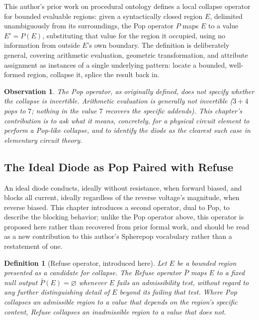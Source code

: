\documentclass[12pt]{article}
\newtheorem{definition}{Definition}
\newtheorem{observation}{Observation}
\begin{document}
This author's prior work on procedural ontology defines a local collapse operator for bounded evaluable regions: given a syntactically closed region $E$, delimited unambiguously from its surroundings, the Pop operator $P$ maps $E$ to a value $E' = P(E)$, substituting that value for the region it occupied, using no information from outside $E$'s own boundary. The definition is deliberately general, covering arithmetic evaluation, geometric transformation, and attribute assignment as instances of a single underlying pattern: locate a bounded, well-formed region, collapse it, splice the result back in.

\begin{observation}
The Pop operator, as originally defined, does not specify whether the collapse is invertible. Arithmetic evaluation is generally not invertible ($3 + 4$ pops to $7$; nothing in the value $7$ recovers the specific addends). This chapter's contribution is to ask what it means, concretely, for a physical circuit element to perform a Pop-like collapse, and to identify the diode as the clearest such case in elementary circuit theory.
\end{observation}

\subsection{The Ideal Diode as Pop Paired with Refuse}

An ideal diode conducts, ideally without resistance, when forward biased, and blocks all current, ideally regardless of the reverse voltage's magnitude, when reverse biased. This chapter introduces a second operator, dual to Pop, to describe the blocking behavior; unlike the Pop operator above, this operator is proposed here rather than recovered from prior formal work, and should be read as a new contribution to this author's Spherepop vocabulary rather than a restatement of one.

\begin{definition}[Refuse operator, introduced here]
Let $E$ be a bounded region presented as a candidate for collapse. The Refuse operator $\bar P$ maps $E$ to a fixed null output $\bar P(E) = \varnothing$ whenever $E$ fails an admissibility test, without regard to any further distinguishing detail of $E$ beyond its failing that test. Where Pop collapses an admissible region to a value that depends on the region's specific content, Refuse collapses an inadmissible region to a value that does not.
\end{definition}
\end{document}
